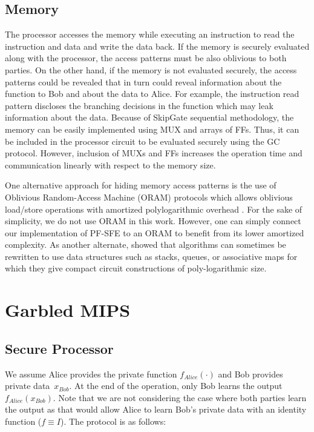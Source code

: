 \subsection{Memory}
The processor accesses the memory while executing an instruction to read the instruction and data and write the data back.
If the memory is securely evaluated along with the processor, the access patterns must be also oblivious to both parties.
On the other hand, if the memory is not evaluated securely, the access patterns could be revealed that in turn could reveal information about the function to Bob and about the data to Alice.
For example, the instruction read pattern discloses the branching decisions in the function which may leak information about the data.
Because of SkipGate sequential methodology, the memory can be easily implemented using MUX and arrays of FFs.
Thus, it can be included in the processor circuit to be evaluated securely using the GC protocol.
However, inclusion of MUXs and FFs increases the operation time and communication linearly with respect to the memory size.

One alternative approach for hiding memory access patterns is the use of Oblivious Random-Access Machine (ORAM) protocols \cite{goldreich1996software} which allows oblivious load/store operations with amortized polylogarithmic overhead \cite{gordon2012secure,liu2014automating,lu2013garble,gentry2014garbled}.
For the sake of simplicity, we do not use ORAM in this work.
However, one can simply connect our implementation of PF-SFE to an ORAM to benefit from its lower amortized complexity.
As another alternate, \cite{zahur2013circuit} showed that algorithms can sometimes be rewritten to use data structures such as stacks, queues, or associative maps for which they give compact circuit constructions of poly-logarithmic size.

\section{Garbled MIPS}
\subsection{Secure Processor}
We assume Alice provides the private function $f_{Alice}(\cdot)$ and Bob provides private data~$x_{Bob}$.
At the end of the operation, only Bob learns the output $f_{Alice}(x_{Bob})$.
Note that we are not considering the case where both parties learn the output as that would allow Alice to learn Bob's private data with an identity function ($f\equiv I$).
The protocol is as follows:

